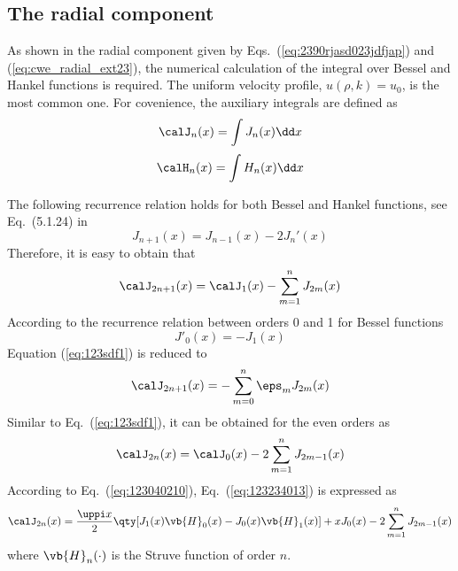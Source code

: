 \subsection{The radial component}


As shown in the radial component given by Eqs.~(\ref{eq:2390rjasd023jdfjap}) and (\ref{eq:cwe_radial_ext23}), the numerical calculation of the integral over Bessel and Hankel functions is required.
The uniform velocity profile, $u(\rho,k) = u_0$, is the most common one.
For covenience, the auxiliary integrals are defined as
\begin{equation}
    \calJ_n(x) = \int J_n(x)\dd x
    \label{eq:12123}
\end{equation}
\begin{equation}
    \calH_n(x) = \int H_n(x) \dd x
    \label{eq:320242}
\end{equation}

The following recurrence relation holds for both Bessel and Hankel functions, see Eq.~(5.1.24) in \cite{Zhang1996ComputationSpecialFunctions}
\begin{equation}
    J_{n+1}(x) = J_{n-1}(x)-2J_n'(x)
    \label{eq:bessel_recurrence}
\end{equation}
Therefore, it is easy to obtain that 
\begin{equation}
    \calJ_{2n+1}(x) = \calJ_1(x) - \sum_{m=1}^n J_{2m}(x)
    \label{eq:123sdf1}
\end{equation}
According to the recurrence relation between orders 0 and 1 for Bessel functions
\begin{equation}
    J'_0(x) = -J_1(x)
    \label{eq:bew02}
\end{equation}
Equation (\ref{eq:123sdf1}) is reduced to 
\begin{equation}
    \calJ_{2n+1}(x) = -\sum_{m=0}^n \eps_m J_{2m}(x)
    \label{eq:12304}
\end{equation}
Similar to Eq.~(\ref{eq:123sdf1}), it can be obtained for the even orders as
\begin{equation}
    \calJ_{2n}(x) = \calJ_0(x) - 2 \sum_{m=1}^n J_{2m-1}(x)
    \label{eq:123234013}
\end{equation}
According to Eq.~(\ref{eq:123040210}), Eq.~(\ref{eq:123234013}) is expressed as
\begin{equation}
    \calJ_{2n}(x) = \frac{\uppi x}{2} \qty[J_1(x)\vb{H}_0(x) - J_0(x)\vb{H}_1(x)] + xJ_0(x)
    - 2\sum_{m=1}^n J_{2m-1}(x)
    \label{eq:13012412310}
\end{equation}
where $\vb{H}_n(\cdot)$ is the Struve function of order $n$.


